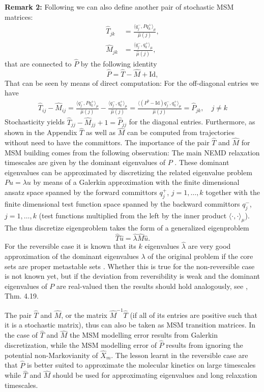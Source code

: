 \documentclass[aps, pre, preprint,unsortedaddress,a4paper,onecolumn]{revtex4}
\newcommand{\fwd}[0]{+}
\newcommand{\bwd}[0]{-}
\newcommand{\id}{\mathrm{Id}}
\begin{document}
\textbf{Remark 2:}
Following \cite{A19-31} we can also define another pair of stochastic MSM matrices: 
\begin{align}\label{eq:msm-ht-1}
  \hat T_{jk} &= \frac{\langle q_j^\bwd, P q_k^\fwd \rangle_\mu}{\hat \mu(j)},\\\label{eq:msm-hm-1}
  \hat M_{jk} &= \frac{\langle q_j^\bwd, q_k^\fwd \rangle_\mu}{\hat \mu(j)},
\end{align}
that are connected to $\hat{P}$ by the following identity
\[
\hat{P}=\hat{T}-\hat{M}+\id,
\]
That can be seen by means of direct computation: For the off-diagonal entries we have
\begin{align}\label{eq:msm-tmp26}
  \hat T_{ij} - \hat M_{ij}
  = \frac{\langle q_j^\bwd, P q_k^\fwd \rangle_\mu}{\hat \mu(j)}
  - \frac{\langle q_j^\bwd,  q_k^\fwd \rangle_\mu}{\hat \mu(j)}
  = \frac{\langle (P^b - \id) q_j^\bwd, q_k^\fwd \rangle_\mu}{\hat \mu(j)}
  = \hat P_{jk}, \quad j\neq k
\end{align}
Stochasticity yields
$\hat T_{jj} - \hat M_{jj} + 1 = \hat P_{jj}$ for the diagonal entries.  Furthermore, as shown in the Appendix $\hat{T}$ as well as $\hat{M}$ can be computed from trajectories without need to have the committors. 
The importance of the pair $\hat{T}$ and $\hat{M}$ for MSM building comes from the following observation: The main NEMD relaxation timescales are given by the dominant eigenvalues of $P$ \cite{A19-31, A19-1}.
These dominant eigenvalues can be approximated by discretizing the related eigenvalue problem $Pu=\lambda u$ by means of a Galerkin approximation with the finite dimensional ansatz space 
spanned by the forward committors $q^+_j$, $j=1,\ldots,k$ together  with the finite dimensional test function space spanned by the backward committors $q^-_j$, $j=1,\ldots,k$ (test functions multiplied from the left by the inner product $\langle\cdot,\cdot\rangle_\mu$). The thus discretize eigenproblem takes the form  of a generalized eigenproblem
\[
\hat{T}\hat{u}=\hat{\lambda}\hat{M}\hat{u}.
\]
For the reversible case it is known that its $k$ eigenvalues $\hat{\lambda}$ are very good approximation of the dominant eigenvalues $\lambda$ of the original problem if the core sets are proper metastable sets \cite{Eigenvalues}. Whether this is true for the non-reversible case is not known yet, but if the deviation from reversibility is weak and the dominant eigenvalues of $P$ are real-valued then the results should hold analogously, see \cite{A19-31}, Thm. 4.19. 

The pair $\hat{T}$ and $\hat{M}$, or the matrix $\hat{M}^{-1}\hat{T}$ (if all of its entries are positive such that it is a stochastic matrix), thus can also be taken as MSM transition matrices. In the case of  $\hat{T}$ and $\hat{M}$ the MSM modelling error results from Galerkin discretization, while the MSM modelling error of $\hat{P}$ results from ignoring the potential non-Markovianity of $\hat{X}_m$. The lesson learnt in the reversible case are that $\hat{P}$ is better suited to approximate the molecular kinetics on large timescales while $\hat{T}$ and $\hat{M}$ should be used for approximating eigenvalues and long relaxation timescales.
\end{document}
